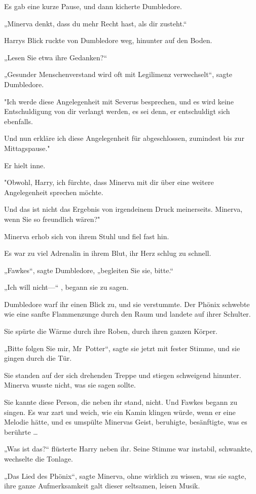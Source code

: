 {Es gab eine kurze Pause, und dann kicherte Dumbledore.

„Minerva denkt, dass du mehr Recht hast, als dir zusteht.“

Harrys Blick ruckte von Dumbledore weg, hinunter auf den Boden.

„Lesen Sie etwa ihre Gedanken?“

„Gesunder Menschenverstand wird oft mit Legilimenz verwechselt“, sagte Dumbledore.

"Ich werde diese Angelegenheit mit Severus besprechen, und es wird keine Entschuldigung von dir verlangt werden, es sei denn, er entschuldigt sich ebenfalls.

Und nun erkläre ich diese Angelegenheit für abgeschlossen, zumindest bis zur Mittagspause."

Er hielt inne.

"Obwohl, Harry, ich fürchte, dass Minerva mit dir über eine weitere Angelegenheit sprechen möchte.

Und das ist nicht das Ergebnis von irgendeinem Druck meinerseits. Minerva, wenn Sie so freundlich wären?"

Minerva erhob sich von ihrem Stuhl und fiel fast hin.

Es war zu viel Adrenalin in ihrem Blut, ihr Herz schlug zu schnell.

„Fawkes“, sagte Dumbledore, „begleiten Sie sie, bitte.“

„Ich will nicht—“ , begann sie zu sagen.

Dumbledore warf ihr einen Blick zu, und sie verstummte. Der Phönix schwebte wie eine sanfte Flammenzunge durch den Raum und landete auf ihrer Schulter.

Sie spürte die Wärme durch ihre Roben, durch ihren ganzen Körper.

„Bitte folgen Sie mir, Mr~Potter“, sagte sie jetzt mit fester Stimme, und sie gingen durch die Tür.

Sie standen auf der sich drehenden Treppe und stiegen schweigend hinunter. Minerva wusste nicht, was sie sagen sollte.

Sie kannte diese Person, die neben ihr stand, nicht. Und Fawkes begann zu singen. Es war zart und weich, wie ein Kamin klingen würde, wenn er eine Melodie hätte, und es umspülte Minervas Geist, beruhigte, besänftigte, was es berührte …

„Was ist das?“ flüsterte Harry neben ihr. Seine Stimme war instabil, schwankte, wechselte die Tonlage.

„Das Lied des Phönix“, sagte Minerva, ohne wirklich zu wissen, was sie sagte, ihre ganze Aufmerksamkeit galt dieser seltsamen, leisen Musik.

}

